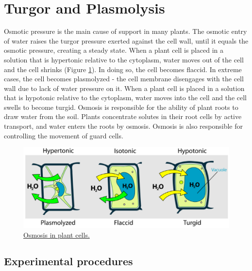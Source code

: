 \section{Turgor and Plasmolysis}\label{turgor-and-plasmolysis}

Osmotic pressure is the main cause of support in many plants. The
osmotic entry of water raises the turgor pressure exerted against the
cell wall, until it equals the osmotic pressure, creating a steady
state. When a plant cell is placed in a solution that is hypertonic
relative to the cytoplasm, water moves out of the cell and the cell
shrinks (Figure \ref{fig:osmosisp}). In doing so, the cell becomes
flaccid. In extreme cases, the cell becomes plasmolyzed - the cell
membrane disengages with the cell wall due to lack of water pressure on
it. When a plant cell is placed in a solution that is hypotonic relative
to the cytoplasm, water moves into the cell and the cell swells to
become turgid. Osmosis is responsible for the ability of plant roots to
draw water from the soil. Plants concentrate solutes in their root cells
by active transport, and water enters the roots by osmosis. Osmosis is
also responsible for controlling the movement of guard cells.

\begin{figure}

{\centering \includegraphics[width=0.7\linewidth]{./figures/exchange/Osmosis_plant}

}

\caption{\href{https://commons.wikimedia.org/wiki/File:Turgor_pressure_on_plant_cells_diagram.svg}{Osmosis
in plant cells.}}\label{fig:osmosisp}
\end{figure}

\subsection{Experimental procedures}\label{experimental-procedures-16}

